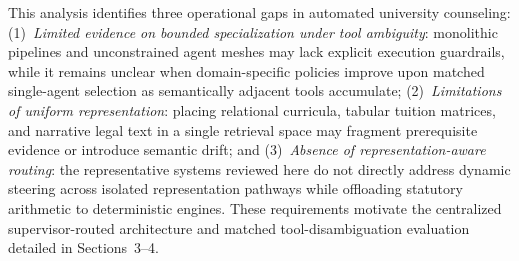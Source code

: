 This analysis identifies three operational gaps in automated university counseling: (1)~\emph{Limited evidence on bounded specialization under tool ambiguity}: monolithic pipelines and unconstrained agent meshes may lack explicit execution guardrails, while it remains unclear when domain-specific policies improve upon matched single-agent selection as semantically adjacent tools accumulate; (2)~\emph{Limitations of uniform representation}: placing relational curricula, tabular tuition matrices, and narrative legal text in a single retrieval space may fragment prerequisite evidence or introduce semantic drift; and (3)~\emph{Absence of representation-aware routing}: the representative systems reviewed here do not directly address dynamic steering across isolated representation pathways while offloading statutory arithmetic to deterministic engines. These requirements motivate the centralized supervisor-routed architecture and matched tool-disambiguation evaluation detailed in Sections~3--4.
